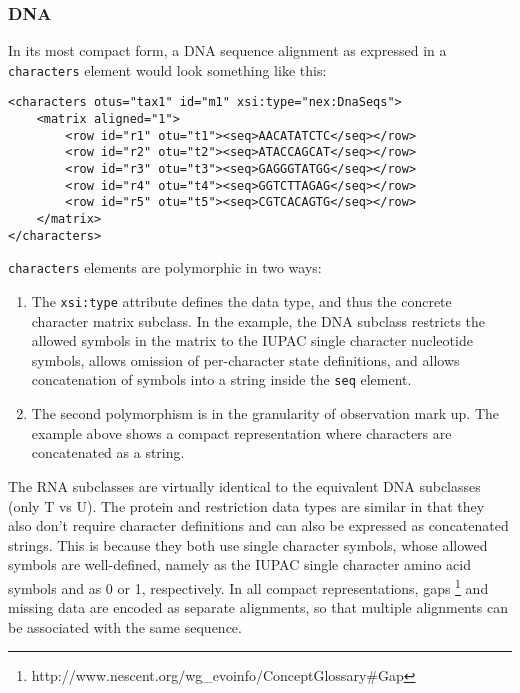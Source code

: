 \documentclass{article}
\newcommand{\code}{\texttt} \usepackage{fullpage}
\begin{document}
\subsubsection{DNA} In its most compact form, a DNA sequence alignment
as expressed in a \code{characters} element would look something like
this: 
\begin{verbatim} 
<characters otus="tax1" id="m1" xsi:type="nex:DnaSeqs"> 
    <matrix aligned="1"> 
        <row id="r1" otu="t1"><seq>AACATATCTC</seq></row> 
        <row id="r2" otu="t2"><seq>ATACCAGCAT</seq></row> 
        <row id="r3" otu="t3"><seq>GAGGGTATGG</seq></row> 
        <row id="r4" otu="t4"><seq>GGTCTTAGAG</seq></row> 
        <row id="r5" otu="t5"><seq>CGTCACAGTG</seq></row> 
    </matrix> 
</characters>
\end{verbatim} 
\code{characters} elements are polymorphic in two ways:

\begin{enumerate}

\item The \code{xsi:type} attribute defines the data type, and thus the
concrete character matrix subclass. In the example, the DNA subclass
restricts the allowed symbols in the matrix to the IUPAC single
character nucleotide symbols, allows omission of per-character state
definitions, and allows concatenation of symbols into a string inside
the \code{seq} element.

\item The second polymorphism is in the granularity of observation mark
up. The example above shows a compact representation where characters
are concatenated as a string.

\end{enumerate}

The RNA subclasses are virtually identical to the equivalent DNA
subclasses (only T vs U). The protein and restriction data types are
similar in that they also don't require character definitions and can
also be expressed as concatenated strings. This is because they both use
single character symbols, whose allowed symbols are well-defined, namely
as the IUPAC single character amino acid symbols and as 0 or 1,
respectively. In all compact representations, gaps
\footnote{http://www.nescent.org/wg\_evoinfo/ConceptGlossary\#Gap} and
missing data are encoded as separate alignments, so that multiple
alignments can be associated with the same sequence.
\end{document}
